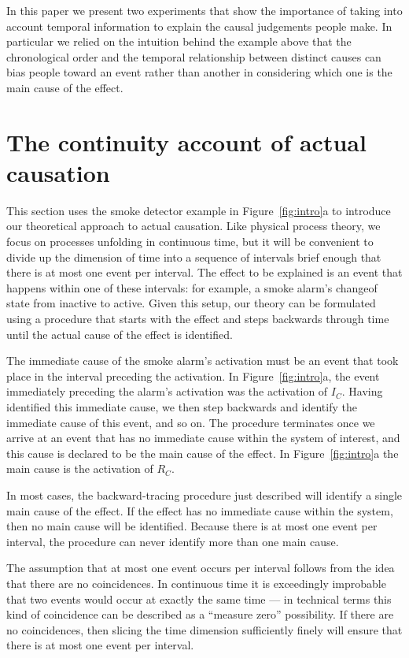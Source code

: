 \documentclass[10pt,letterpaper]{article}
\newcommand{\ev}[2]{$#1_#2$}
\begin{document}
In this paper we present two experiments that show the importance of taking into account temporal information to explain the causal judgements people make. In particular we relied on the intuition behind the example above that the chronological order and the temporal relationship between distinct causes can bias people toward an event rather than another in considering which one is the main cause of the effect.

% 

\section{The continuity account of actual causation}

This section uses the smoke detector example in Figure~\ref{fig:intro}a to introduce our theoretical approach to actual causation. Like physical process theory, we focus on processes unfolding in continuous time, but it will be convenient to divide up the dimension of time into a sequence of intervals brief enough that there is at most one event per interval. The effect to be explained is an event that happens within one of these intervals: for example, a smoke alarm's changeof state from inactive to active. Given this setup, our theory can be formulated using a procedure that starts with the effect and steps backwards through time until the actual cause of the effect is identified.

The immediate cause of the smoke alarm's activation must be an event that took place in the interval preceding the activation. In Figure~\ref{fig:intro}a, the event immediately preceding the alarm's activation was the activation of \ev{I}{C}. Having identified this immediate cause, we then step backwards and identify the immediate cause of this event, and so on.  The procedure terminates once we arrive at an event that has no immediate cause within the system of interest, 
and this cause is declared to be the main cause of the effect.  In Figure~\ref{fig:intro}a the main cause is the activation of \ev{R}{C}. 

In most cases, the backward-tracing procedure just described will identify a single main cause of the effect. If the effect has no immediate cause within the system, then no main cause will be identified. Because there is at most one event per interval, the procedure can never identify more than one main cause.

The assumption that at most one event occurs per interval follows from the idea that there are no coincidences. In continuous time it is exceedingly improbable that two events would occur at exactly the same time --- in technical terms this kind of coincidence can be described as a ``measure zero'' possibility. If there are no coincidences, then slicing the time dimension sufficiently finely will ensure that there is at most one event per interval.
\end{document}
